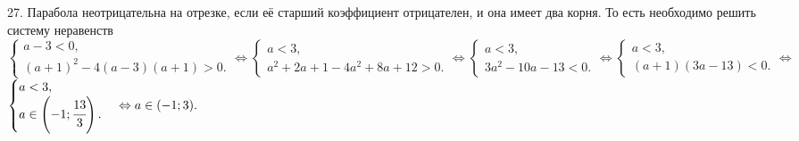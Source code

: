 27. Парабола неотрицательна на отрезке, если её старший коэффициент отрицателен, и она имеет два корня. То есть необходимо решить систему неравенств $\begin{cases} a-3<0,\\ (a+1)^2-4(a-3)(a+1)>0.\end{cases}\Leftrightarrow\begin{cases} a<3,\\ a^2+2a+1-4a^2+8a+12>0.\end{cases}\Leftrightarrow
\begin{cases} a<3,\\ 3a^2-10a-13<0.\end{cases}\Leftrightarrow\begin{cases} a<3,\\ (a+1)(3a-13)<0.\end{cases}\Leftrightarrow$\\$
\begin{cases} a<3,\\ a\in\left(-1;\cfrac{13}{3}\right).\end{cases}\Leftrightarrow a\in(-1;3).$\\
